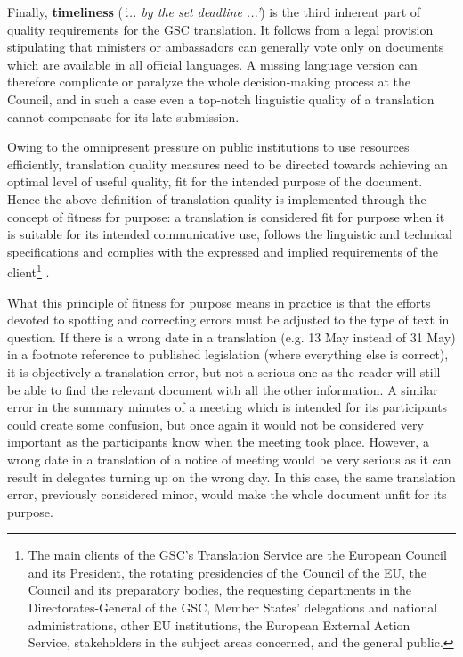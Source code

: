 \documentclass[output=paper]{langsci/langscibook}
\begin{document}
Finally, \textbf{timeliness} (\textit{‘... by the set deadline ...’}) is the third inherent part of quality requirements for the GSC translation. It follows from a legal provision stipulating that ministers or ambassadors can generally vote only on documents which are available in all official languages. A missing language version can therefore complicate or paralyze the whole decision-making process at the Council, and in such a case even a top-notch linguistic quality of a translation cannot compensate for its late submission.

Owing to the omnipresent pressure on public institutions to use resources efficiently, translation quality measures need to be directed towards achieving an optimal level of useful quality, fit for the intended purpose of the document. Hence the above definition of translation quality is implemented through the concept of fitness for purpose: a translation is considered fit for purpose when it is suitable for its intended communicative use, follows the linguistic and technical specifications and complies with the expressed and implied requirements of the client\footnote{The main clients of the GSC's Translation Service are the European Council and its President, the rotating presidencies of the Council of the EU, the Council and its preparatory bodies, the requesting departments in the Directorates-General of the GSC, Member States' delegations and national administrations, other EU institutions, the European External Action Service, stakeholders in the subject areas concerned, and the general public.} \citep[36]{Council2015}. 

What this principle of fitness for purpose means in practice is that the efforts devoted to spotting and correcting errors must be adjusted to the type of text in question. If there is a wrong date in a translation (e.g. 13 May instead of 31 May) in a footnote reference to published legislation (where everything else is correct), it is objectively a translation error, but not a serious one as the reader will still be able to find the relevant document with all the other information. A similar error in the summary minutes of a meeting which is intended for its participants could create some confusion, but once again it would not be considered very important as the participants know when the meeting took place. However, a wrong date in a translation of a notice of meeting would be very serious as it can result in delegates turning up on the wrong day. In this case, the same translation error, previously considered minor, would make the whole document unfit for its purpose.
\end{document}
